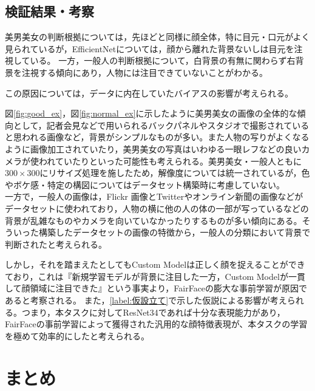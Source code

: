 \documentclass[a4paper,11pt,titlepage]{jsarticle}
\begin{document}
\subsection{検証結果・考察}
\label{label:検証結果・考察}

美男美女の判断根拠については，先ほどと同様に顔全体，特に目元・口元がよく見られているが，EfficientNetについては，顔から離れた背景ないしは目元を注視している。
一方，一般人の判断根拠について，白背景の有無に関わらず右背景を注視する傾向にあり，人物には注目できていないことがわかる。

この原因については，データに内在していたバイアスの影響が考えられる。\par
図\ref{fig:good_ex}，図\ref{fig:normal_ex}に示したように美男美女の画像の全体的な傾向として，記者会見などで用いられるバックパネルやスタジオで撮影されていると思われる画像など，背景がシンプルなものが多い。また人物の写りがよくなるように画像加工されていたり，美男美女の写真はいわゆる一眼レフなどの良いカメラが使われていたりといった可能性も考えられる。美男美女・一般人ともに$300 \times 300$にリサイズ処理を施したため，解像度については統一されているが，色やボケ感・特定の構図についてはデータセット構築時に考慮していない。\\

一方で，一般人の画像は，Flickr 画像とTwitterやオンライン新聞の画像などがデータセットに使われており，人物の横に他の人の体の一部が写っているなどの背景が乱雑なものやカメラを向いていなかったりするものが多い傾向にある。そういった構築したデータセットの画像の特徴から，一般人の分類において背景で判断されたと考えられる。\par



しかし，それを踏まえたとしてもCustom Modelは正しく顔を捉えることができており，これは『新規学習モデルが背景に注目した一方，Custom Modelが一貫して顔領域に注目できた』という事実より，FairFaceの膨大な事前学習が原因であると考察される。
また，\ref{label:仮設立て}で示した仮説による影響が考えられる。つまり，本タスクに対してResNet34であれば十分な表現能力があり，FairFaceの事前学習によって獲得された汎用的な顔特徴表現が、本タスクの学習を極めて効率的にしたと考えられる。



\section{まとめ}
\label{label:まとめ}
\end{document}
